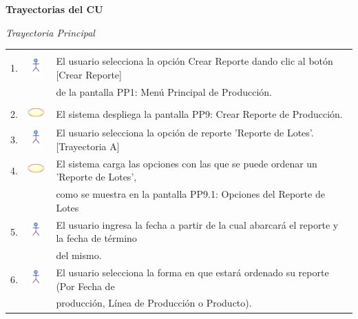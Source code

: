 \documentclass[10pt,spanish]{article}
\providecommand{\tabularnewline}{\\}
\begin{document}
	\newpage
	\textbf{\large Trayectorias del CU\\}{\large \par}
	\textit{\large Trayectoria Principal}{\large{} }{\large \par}
	\begin{tabular}{ccl}
	 &  & \tabularnewline
	1. & \includegraphics{actor} & El usuario selecciona la opción Crear Reporte dando clic al botón [Crear Reporte] \tabularnewline
	& &  de la pantalla PP1: Menú Principal de Producción.\tabularnewline
\tabularnewline

	2. & \includegraphics{sistema} &  El sistema despliega la pantalla PP9: Crear Reporte de Producción.\tabularnewline
	
	3. & \includegraphics{actor} & El usuario selecciona la opción de reporte 'Reporte de Lotes'. [Trayectoria A] \tabularnewline 

	4. & \includegraphics{sistema} & El sistema carga las opciones con las que se puede ordenar un 'Reporte de Lotes', \tabularnewline
	& & como se muestra en la pantalla PP9.1: Opciones del Reporte de Lotes \tabularnewline
	
	5. & \includegraphics{actor} & El usuario ingresa la fecha a partir de la cual abarcará el reporte y la fecha de término \tabularnewline
	&  & del mismo.\tabularnewline
	
	6. & \includegraphics{actor} & El usuario selecciona la forma en que estará ordenado su reporte (Por Fecha de \tabularnewline
	& & producción, Línea de Producción o Producto). \tabularnewline
	

\end{tabular}
\end{document}
